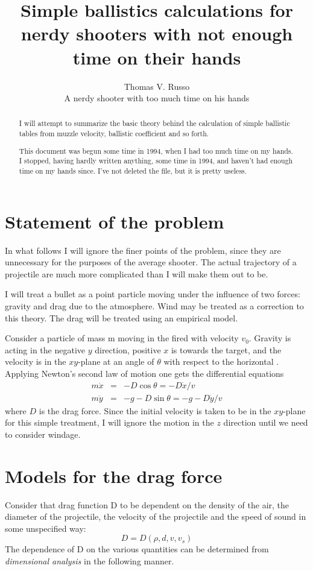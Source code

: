 \documentclass[12pt]{article}
\begin{document}
\author{Thomas V. Russo\\A nerdy shooter with too much time on his hands}
\title{Simple ballistics calculations for nerdy shooters with not
enough time on their hands}
\maketitle
\begin{abstract}
I will attempt to summarize the basic theory behind the calculation of
simple ballistic tables from muzzle velocity, ballistic coefficient
and so forth.

This document was begun some time in 1994, when I had too much time on
my hands.  I stopped, having hardly written anything, some time in
1994, and haven't had enough time on my hands since.  I've not deleted
the file, but it is pretty useless.
\end{abstract}
\section{Statement of the problem}
In what follows I will ignore the finer points of the problem, since
they are unnecessary for the purposes of the average shooter.  The
actual trajectory of a projectile are much more complicated than I
will make them out to be.  

I will treat a bullet as a point particle moving under the influence
of two forces: gravity and drag due to the atmosphere. Wind may be
treated as a correction to this theory.  The drag will be treated
using an empirical model.

Consider a particle of mass m moving in the fired with velocity $v_0$.
Gravity is acting in the negative $y$ direction, positive $x$ is
towards the target, and the velocity is in the $xy$-plane at an angle
of $\theta$ with respect to the horizontal .  Applying Newton's second
law of motion one gets the differential equations
\begin{eqnarray}
\label{eq:newton-3}
m\ddot{x} &=& -D\cos\theta =-D \dot{x}/v\\
m\ddot{y} &=& -g - D\sin\theta = -g - D \dot{y}/v 
\end{eqnarray}
where $D$ is the drag force.  Since the initial velocity is taken
to be in the $xy$-plane for this simple treatment, I will ignore the
motion in the $z$ direction until we need to consider windage.

\section{Models for the drag force}
Consider that drag function D to be dependent on the density of the
air, the diameter of the projectile, the velocity of the projectile
and the speed of sound in some unspecified way:
\begin{equation} D=D(\rho,d,v,v_s) \end{equation}
The dependence of D on the various quantities can be determined from
{\em dimensional analysis} in the following manner.
\end{document}
